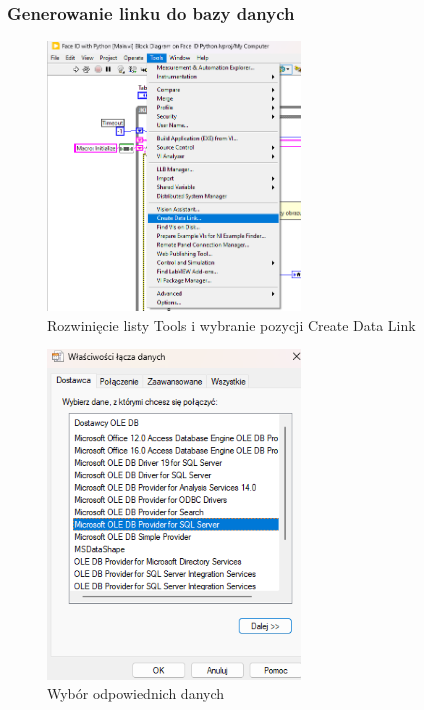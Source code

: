 \documentclass{report}
\begin{document}
\subsubsection{\large Generowanie linku do bazy danych}

\begin{figure}[H]
    \centering
    \includegraphics[width=0.6\textwidth]{src/Database/Stage1.png}
    \caption{Rozwinięcie listy Tools i wybranie pozycji Create Data Link}
    \label{fig:first-att}
\end{figure}

\begin{figure}[H]
    \centering
    \includegraphics[width=0.6\textwidth]{src/Database/Stage2.png}
    \caption{Wybór odpowiednich danych}
    \label{fig:first-att}
\end{figure}
\end{document}
